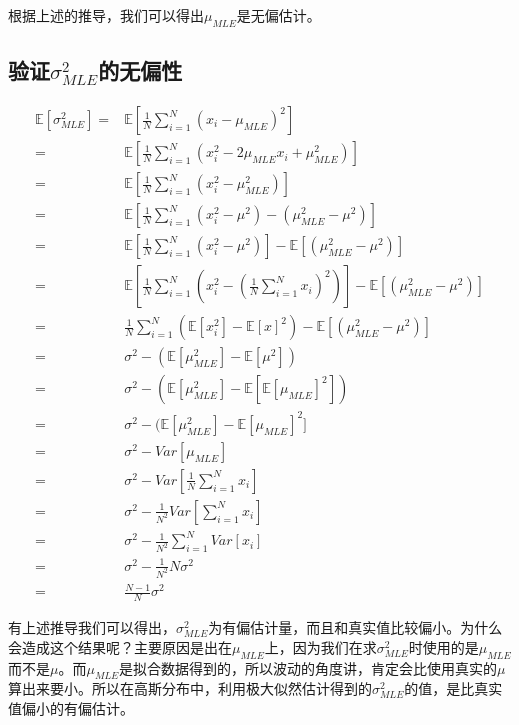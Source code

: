 \documentclass[a4paper]{article}
\begin{document}
根据上述的推导，我们可以得出$\mu_{MLE}$是无偏估计。

\subsection{验证$\sigma^2_{MLE}$的无偏性}

\begin{equation}
    \begin{split}
        \mathbb{E}[\sigma^2_{MLE}] = & \mathbb{E}[ \frac{1}{N}\sum_{i=1}^N (x_i-\mu_{MLE})^2] \\
        = & \mathbb{E}[ \frac{1}{N}\sum_{i=1}^N (x_i^2-2\mu_{MLE} x_i + \mu_{MLE}^2)] \\
        = & \mathbb{E}[ \frac{1}{N}\sum_{i=1}^N (x_i^2- \mu_{MLE}^2)]\\
        = & \mathbb{E}[ \frac{1}{N}\sum_{i=1}^N (x_i^2-\mu^2)-(\mu_{MLE}^2-\mu^2)] \\
        = & \mathbb{E}[ \frac{1}{N}\sum_{i=1}^N (x_i^2-\mu^2)]-\mathbb{E}[(\mu_{MLE}^2-\mu^2)]\\
        = & \mathbb{E}[ \frac{1}{N}\sum_{i=1}^N (x_i^2-(\frac{1}{N}\sum_{i=1}^Nx_i)^2)]-\mathbb{E}[(\mu_{MLE}^2-\mu^2)]\\
        = & \frac{1}{N}\sum_{i=1}^{N}(\mathbb{E}[x_i^2]-\mathbb{E}[x]^2)-\mathbb{E}[(\mu_{MLE}^2-\mu^2)] \\
        = & \sigma^2 - (\mathbb{E}[\mu_{MLE}^2] - \mathbb{E}[\mu^2]) \\
        = & \sigma^2 - (\mathbb{E}[\mu_{MLE}^2] - \mathbb{E}[\mathbb{E}[\mu_{MLE}]^2]) \\
        = & \sigma^2 - (\mathbb{E}[\mu_{MLE}^2] - \mathbb{E}[\mu_{MLE}]^2] \\
        = & \sigma^2 - Var[\mu_{MLE}] \\
        = & \sigma^2 - Var[\frac{1}{N}\sum_{i=1}^Nx_i] \\
        = & \sigma^2 - \frac{1}{N^2}Var[\sum_{i=1}^Nx_i] \\
        = & \sigma^2 - \frac{1}{N^2}\sum_{i=1}^NVar[x_i] \\ 
        = & \sigma^2 - \frac{1}{N^2} N \sigma^2 \\
        = & \frac{N-1}{N}\sigma^2
    \end{split}
\end{equation}

有上述推导我们可以得出，$\sigma^2_{MLE}$为有偏估计量，而且和真实值比较偏小。为什么会造成这个结果呢？主要原因是出在$\mu_{MLE}$上，因为我们在求$\sigma^2_{MLE}$时使用的是$\mu_{MLE}$而不是$\mu$。而$\mu_{MLE}$是拟合数据得到的，所以波动的角度讲，肯定会比使用真实的$\mu$算出来要小。所以在高斯分布中，利用极大似然估计得到的$\sigma^2_{MLE}$的值，是比真实值偏小的有偏估计。
\end{document}
